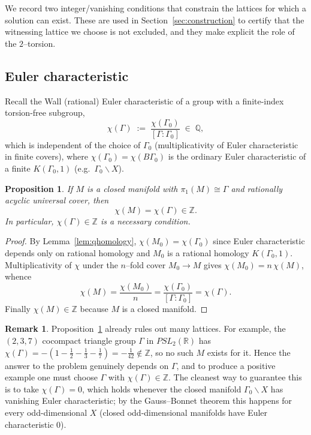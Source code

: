 \documentclass[12pt]{article}
\newcommand{\bR}{\mathbb{R}}
\newcommand{\bQ}{\mathbb{Q}}
\newcommand{\bZ}{\mathbb{Z}}
\newtheorem{proposition}{Proposition}
\theoremstyle{definition}
\newtheorem{remark}{Remark}
\begin{document}
We record two integer/vanishing conditions that constrain the lattices for which a
solution can exist.  These are used in Section~\ref{sec:construction} to certify
that the witnessing lattice we choose is not excluded, and they make explicit the
role of the $2$--torsion.

\subsection{Euler characteristic}

Recall the Wall (rational) Euler characteristic of a group with a finite-index
torsion-free subgroup,
\[
   \chi(\Gamma)\;:=\;\frac{\chi(\Gamma_0)}{[\Gamma:\Gamma_0]}\;\in\;\bQ ,
\]
which is independent of the choice of $\Gamma_0$ (multiplicativity of Euler
characteristic in finite covers), where $\chi(\Gamma_0)=\chi(B\Gamma_0)$ is the
ordinary Euler characteristic of a finite $K(\Gamma_0,1)$ (e.g.\
$\Gamma_0\backslash X$).

\begin{proposition}\label{prop:euler}
If $M$ is a closed manifold with $\pi_1(M)\cong\Gamma$ and rationally acyclic
universal cover, then
\[
   \chi(M)=\chi(\Gamma)\in\bZ .
\]
In particular, $\chi(\Gamma)\in\bZ$ is a \emph{necessary} condition.
\end{proposition}

\begin{proof}
By Lemma~\ref{lem:qhomology}, $\chi(M_0)=\chi(\Gamma_0)$ since Euler
characteristic depends only on rational homology and $M_0$ is a rational homology
$K(\Gamma_0,1)$.  Multiplicativity of $\chi$ under the $n$--fold cover
$M_0\to M$ gives $\chi(M_0)=n\,\chi(M)$, whence
\[
   \chi(M)=\frac{\chi(M_0)}{n}=\frac{\chi(\Gamma_0)}{[\Gamma:\Gamma_0]}
          =\chi(\Gamma).
\]
Finally $\chi(M)\in\bZ$ because $M$ is a closed manifold.
\end{proof}

\begin{remark}\label{rem:triangle}
Proposition~\ref{prop:euler} already rules out many lattices.  For example, the
$(2,3,7)$ cocompact triangle group $\Gamma$ in $PSL_2(\bR)$ has
$\chi(\Gamma)=-(1-\tfrac12-\tfrac13-\tfrac17)=-\tfrac1{42}\notin\bZ$, so no such
$M$ exists for it.  Hence the answer to the problem genuinely depends on
$\Gamma$, and to produce a positive example one must choose $\Gamma$ with
$\chi(\Gamma)\in\bZ$.  The cleanest way to guarantee this is to take
$\chi(\Gamma)=0$, which holds whenever the closed manifold
$\Gamma_0\backslash X$ has vanishing Euler characteristic; by the Gauss--Bonnet
theorem this happens for every odd-dimensional $X$ (closed odd-dimensional
manifolds have Euler characteristic $0$).
\end{remark}
\end{document}
